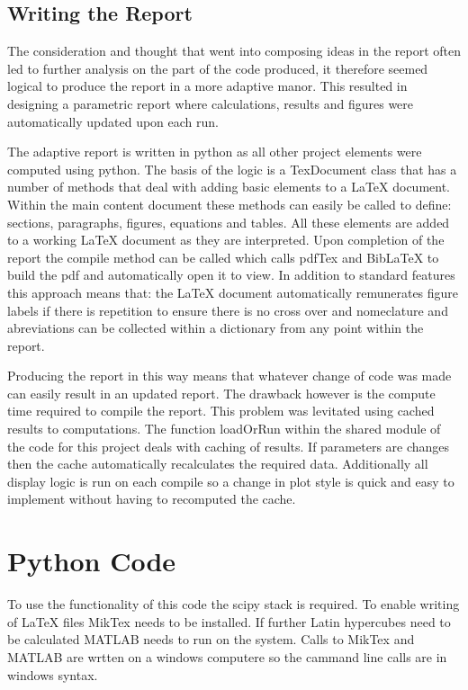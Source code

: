 \documentclass[a4paper,12pt,twoside]{article}
\begin{document}
\subsection{Writing the Report}
\label{sec:writing_the_report}

The consideration and thought that went into composing ideas in the report often led to further analysis on the part of the code produced, it therefore seemed logical to produce the report in a more adaptive manor. This resulted in designing a parametric report where calculations, results and figures were automatically updated upon each run.

The adaptive report is written in python as all other project elements were computed using python. The basis of the logic is a TexDocument class that has a number of methods that deal with adding basic elements to a LaTeX document. Within the main content document these methods can easily be called to define: sections, paragraphs, figures, equations and tables. All these elements are added to a working LaTeX document as they are interpreted. Upon completion of the report the compile method can be called which calls pdfTex and BibLaTeX to build the pdf and automatically open it to view. In addition to standard features this approach means that: the LaTeX document automatically remunerates figure labels if there is repetition to ensure there is no cross over and nomeclature and abreviations can be collected within a dictionary from any point within the report.

Producing the report in this way means that whatever change of code was made can easily result in an updated report. The drawback however is the compute time required to compile the report. This problem was levitated using cached results to computations. The function loadOrRun within the shared module of the code for this project deals with caching of results. If parameters are changes then the cache automatically recalculates the required data. Additionally all display logic is run on each compile so a change in plot style is quick and easy to implement without having to recomputed the cache.

\section{Python Code}
\label{sec:python_code}

To use the functionality of this code the scipy stack is required. To enable writing of LaTeX files MikTex needs to be installed. If further Latin hypercubes need to be calculated MATLAB needs to run on the system. Calls to MikTex and MATLAB are wrtten on a windows computere so the cammand line calls are in windows syntax.
\end{document}
